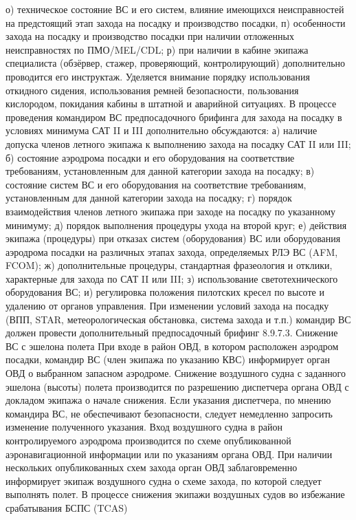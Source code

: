 о)	техническое состояние ВС и его систем, влияние имеющихся неисправностей на предстоящий этап захода на посадку и производство посадки, 
п)	особенности захода на посадку и производство посадки при наличии отложенных неисправностях по ПМО/MEL/CDL;
р)	при наличии в кабине экипажа специалиста (обзёрвер, стажер, проверяющий, контролирующий) дополнительно проводится его инструктаж. 
Уделяется внимание порядку использования откидного сидения, использования ремней безопасности, пользования кислородом, покидания кабины в штатной и аварийной ситуациях.
В процессе проведения командиром ВС предпосадочного брифинга для захода на посадку в условиях минимума САТ II и III дополнительно обсуждаются: 
а)	наличие допуска членов летного экипажа к выполнению захода на посадку САТ II или III; 
б)	состояние аэродрома посадки и его оборудования на соответствие требованиям, установленным для данной категории захода на посадку; 
в)	состояние систем ВС и его оборудования на соответствие требованиям, установленным для данной категории захода на посадку; 
г)	порядок взаимодействия членов летного экипажа при заходе на посадку по указанному минимуму; 
д)	порядок выполнения процедуры ухода на второй круг; 
е)	действия экипажа (процедуры) при отказах систем (оборудования) ВС или оборудования аэродрома посадки на различных этапах захода, определяемых РЛЭ ВС (AFM, FCOM); 
ж)	дополнительные процедуры, стандартная фразеология и отклики, характерные для захода по САТ II или III; 
з)	использование светотехнического оборудования ВС; 
и)	регулировка положения пилотских кресел по высоте и удалению от органов управления. 
При изменении условий захода на посадку (ВПП, STAR, метеорологическая обстановка, система захода и т.п.) командир ВС должен провести дополнительный предпосадочный брифинг
8.9.7.3.	Снижение ВС с эшелона полета
При входе в район ОВД, в котором расположен аэродром посадки, командир ВС (член экипажа по указанию КВС) информирует орган ОВД о выбранном запасном аэродроме. 
Снижение воздушного судна с заданного эшелона (высоты) полета производится по разрешению диспетчера органа ОВД с докладом экипажа о начале снижения. Если указания диспетчера, по мнению командира ВС, не обеспечивают безопасности, следует немедленно запросить изменение полученного указания. 
Вход воздушного судна в район контролируемого аэродрома производится по схеме опубликованной аэронавигационной информации или по указаниям органа ОВД. При наличии нескольких опубликованных схем захода орган ОВД заблаговременно информирует экипаж воздушного судна о схеме захода, по которой следует выполнять полет. 
В процессе снижения экипажи воздушных судов во избежание срабатывания БСПС (TCAS)
